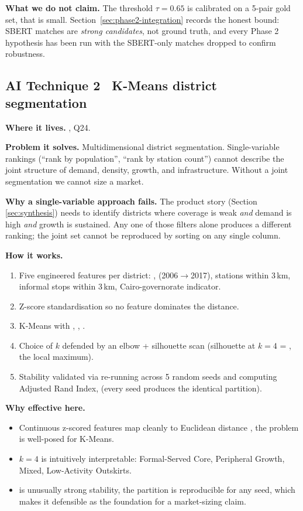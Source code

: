 \textbf{What we do not claim.} The threshold $\tau = 0.65$ is calibrated
on a 5-pair gold set, that is small. Section~\ref{sec:phase2-integration}
records the honest bound: SBERT matches are \emph{strong candidates},
not ground truth, and every Phase 2 hypothesis has been run with the
SBERT-only matches dropped to confirm robustness.

\subsection{AI Technique 2 \textbullet\ K-Means district segmentation}

\textbf{Where it lives.} 
, Q24.

\textbf{Problem it solves.} Multidimensional district segmentation.
Single-variable rankings (``rank by population'', ``rank by station
count'') cannot describe the joint structure of demand, density,
growth, and infrastructure. Without a joint segmentation we cannot
size a market.

\textbf{Why a single-variable approach fails.} The product story (Section
\ref{sec:synthesis}) needs to identify districts where coverage is
weak \emph{and} demand is high \emph{and} growth is sustained. Any one
of those filters alone produces a different ranking; the joint set
cannot be reproduced by sorting on any single column.

\textbf{How it works.}
\begin{enumerate}
 \item Five engineered features per district:
 ,  (2006$\to$2017),
 stations within 3\,km, informal stops within 3\,km,
 Cairo-governorate indicator.
 \item Z-score standardisation so no feature dominates the distance.
 \item K-Means with , , .
 \item Choice of $k$ defended by an elbow + silhouette scan
 (silhouette at $k=4$ = , the local maximum).
 \item Stability validated via re-running across 5 random seeds and
 computing Adjusted Rand Index,  (every seed
 produces the identical partition).
\end{enumerate}

\textbf{Why effective here.}
\begin{itemize}
 \item Continuous z-scored features map cleanly to Euclidean distance
, the problem is well-posed for K-Means.
 \item $k=4$ is intuitively interpretable: Formal-Served Core,
 Peripheral Growth, Mixed, Low-Activity Outskirts.
 \item {} is unusually strong stability, the
 partition is reproducible for any seed, which makes it
 defensible as the foundation for a market-sizing claim.
\end{itemize}

